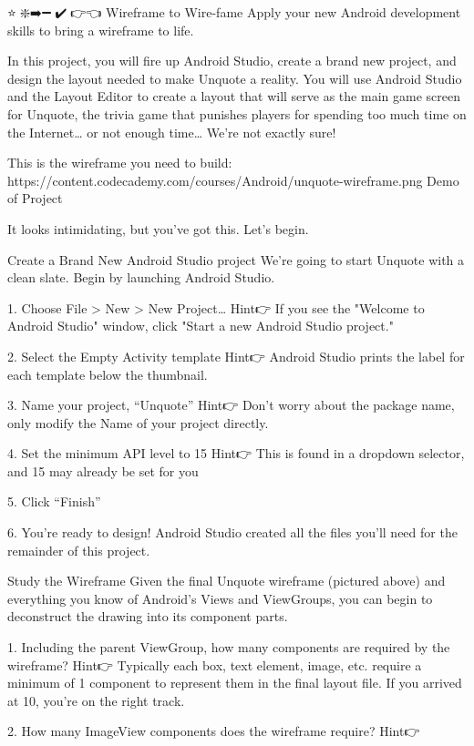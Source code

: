 ⭐🎨❇️➡️➖💎✔️🔗👉👈
Wireframe to Wire-fame
        Apply your new Android development skills to bring a wireframe to life.

        In this project, you will fire up Android Studio, create a brand new project, and design the layout needed to make Unquote a reality. You will use Android Studio and the Layout Editor to create a layout that will serve as the main game screen for Unquote, the trivia game that punishes players for spending too much time on the Internet… or not enough time… We’re not exactly sure!

        This is the wireframe you need to build:
            🎨https://content.codecademy.com/courses/Android/unquote-wireframe.png
                Demo of Project

        It looks intimidating, but you've got this. Let's begin.
        
Create a Brand New Android Studio project
        We’re going to start Unquote with a clean slate. Begin by launching Android Studio.

    1. Choose File > New > New Project…        
        Hint👉 If you see the "Welcome to Android Studio" window, click "Start a new Android Studio project."

    2. Select the Empty Activity template
        Hint👉 Android Studio prints the label for each template below the thumbnail.

    3. Name your project, “Unquote”
        Hint👉 Don't worry about the package name, only modify the Name of your project directly.
    
    4. Set the minimum API level to 15
        Hint👉 This is found in a dropdown selector, and 15 may already be set for you

    5. Click “Finish”
    
    6. You’re ready to design!
        Android Studio created all the files you’ll need for the remainder of this project.

Study the Wireframe
        Given the final Unquote wireframe (pictured above) and everything you know of Android’s Views and ViewGroups, you can begin to deconstruct the drawing into its component parts.

    1. Including the parent ViewGroup, how many components are required by the wireframe?
        Hint👉 Typically each box, text element, image, etc. require a minimum of 1 component to represent them in the final layout file. If you arrived at 10, you're on the right track.

    2. How many ImageView components does the wireframe require?
        Hint👉

